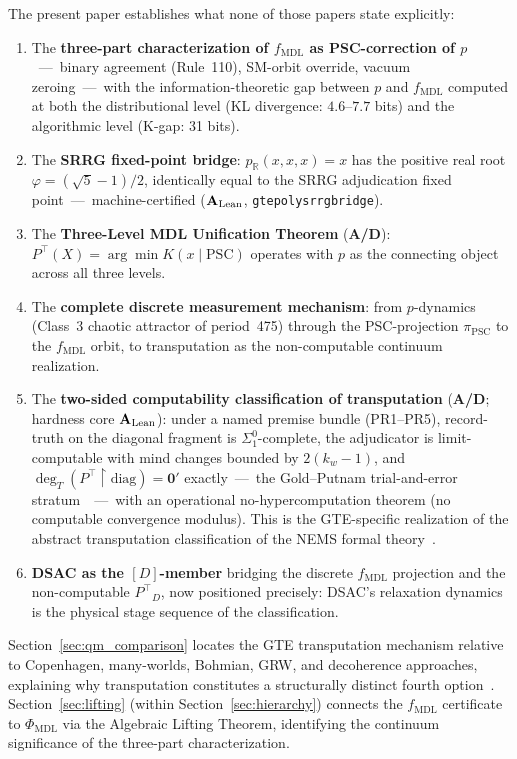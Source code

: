 \documentclass[11pt]{article}
\theoremstyle{remark}
\newcommand{\PSC}{\text{PSC}}
\newcommand{\PHIMDL}{\ensuremath{\Phi_{\mathrm{MDL}}}}
\newcommand{\lean}[1]{%
  \penalty-100
  \begingroup\def\_{\textunderscore\allowbreak}\texttt{#1}\endgroup}
\newcommand{\fmdl}{\ensuremath{f_{\mathrm{MDL}}}}
\newcommand{\Ptop}{\ensuremath{P^{\top}}}
\newcommand{\CatAL}{\ensuremath{\textbf{A}_{\rm Lean}}}
\newcommand{\CatAD}{\textbf{A/D}}
\begin{document}
The present paper establishes what none of those papers state explicitly:
\begin{enumerate}[label=(\roman*)]
  \item The \textbf{three-part characterization of \fmdl{} as PSC-correction
    of $p$}~---~binary agreement (Rule~110), SM-orbit override, vacuum
    zeroing~---~with the information-theoretic gap between $p$ and \fmdl{}
    computed at both the distributional level (KL divergence: $4.6$--$7.7$
    bits) and the algorithmic level (K-gap: 31 bits).
  \item The \textbf{SRRG fixed-point bridge}: $p_{\mathbb{R}}(x,x,x)=x$
    has the positive real root $\varphi = (\sqrt{5}-1)/2$, identically
    equal to the SRRG adjudication fixed point~---~machine-certified
    (\CatAL, \lean{gte\_poly\_srrg\_bridge}).
  \item The \textbf{Three-Level MDL Unification Theorem} (\CatAD):
    $\Ptop(X) = \arg\min K(x \mid \text{PSC})$ operates with $p$ as the
    connecting object across all three levels.
  \item The \textbf{complete discrete measurement mechanism}: from
    $p$-dynamics (Class~3 chaotic attractor of period~475) through the
    PSC-projection $\pi_{\PSC}$ to the \fmdl{} orbit, to transputation
    as the non-computable continuum realization.
  \item The \textbf{two-sided computability classification of
    transputation} (\CatAD{}; hardness core \CatAL): under a named premise
    bundle (PR1--PR5), record-truth on the diagonal fragment is
    $\Sigma^0_1$-complete, the adjudicator is limit-computable with mind
    changes bounded by $2(k_w-1)$, and
    $\deg_T(\Ptop{\upharpoonright}\mathrm{diag}) = \mathbf{0}'$
    exactly~---~the Gold--Putnam trial-and-error
    stratum~\cite{Gold1965,Putnam1965}~---~with an operational
    no-hypercomputation theorem (no computable convergence modulus).
    This is the GTE-specific realization of the abstract transputation
    classification of the NEMS formal theory~\cite{SpivackNEMS76}.
  \item \textbf{DSAC as the $[D]$-member} bridging the discrete \fmdl{}
    projection and the non-computable $\Ptop_D$, now positioned precisely:
    DSAC's relaxation dynamics is the physical stage sequence of the
    classification.
\end{enumerate}

Section~\ref{sec:qm_comparison} locates the GTE transputation mechanism
relative to Copenhagen, many-worlds, Bohmian, GRW, and decoherence
approaches, explaining why transputation constitutes a structurally
distinct fourth option~\cite{SpivackGTECompleteFramework}.
Section~\ref{sec:lifting} (within Section~\ref{sec:hierarchy}) connects
the \fmdl{} certificate to $\PHIMDL$ via the Algebraic Lifting Theorem,
identifying the continuum significance of the three-part characterization.
\end{document}
